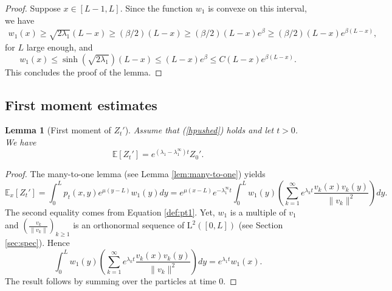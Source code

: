 \documentclass[11pt]{article}
\theoremstyle{plain}
\newtheorem{lemma}{Lemma}[section]
\newcommand\linf{\lambda_1^\infty}
\begin{document}
\begin{proof}
 Suppose $x\in[L-1,L]$. Since the function $w_1$ is convexe on this interval, we have 
\begin{eqnarray*}
w_1(x)\geqslant \sqrt{2\lambda_1}(L-x)\geqslant (\beta/2)(L-x)\geqslant (\beta/2)(L-x)e^{\beta}\geqslant (\beta/2)(L-x)e^{\beta(L-x)},
\end{eqnarray*}
for $L$ large enough, and 
\begin{equation*}
w_1(x)\leqslant \sinh(\sqrt{2\lambda_1})(L-x)\leqslant (L-x)e^{\beta}\leqslant C(L-x)e^{\beta (L-x)}.
\end{equation*}
This concludes the proof of the lemma.
\end{proof}



\subsection{First moment estimates} \label{sec:fm}


\begin{lemma}[First moment of $Z_t'$]\label{lem:fmZ} 
Assume that (\ref{hpushed}) holds and let $t>0$. We have
 \begin{equation*}
    \mathbb{E}[Z_t']=e^{(\lambda_1-\linf)t} Z_0'.
\end{equation*}
\end{lemma}
\begin{proof}
The many-to-one lemma (see Lemma \ref{lem:many-to-one}) yields
\begin{equation*}
\mathbb{E}_x[Z_t']=\int_0^Lp_t(x,y)e^{\mu(y-L)}w_1(y)dy= e^{\mu(x-L)}e^{-\linf t}\int_0^L w_1(y)\left(\sum_{k=1}^\infty e^{\lambda_k t}\frac{v_k(x)v_k(y)}{\|v_k\|^2}\right)dy.
\end{equation*}
The second equality comes from Equation \eqref{def:pt1}.
Yet, $w_1$ is a multiple of $v_1$ and  $\left(\frac{v_k}{\|v_k\|}\right)_{k\geq1}$ is an orthonormal sequence of $\mathrm{L}^2([0,L])$ (see Section \ref{sec:spec}).  Hence
$$\int_0^L w_1(y)\left(\sum_{k=1}^\infty e^{\lambda_k t}\frac{v_k(x)v_k(y)}{\|v_k\|^2}\right)dy=e^{\lambda_1 t}w_1(x).$$ The result follows by summing over the particles at time $0$.
\end{proof}
\end{document}
